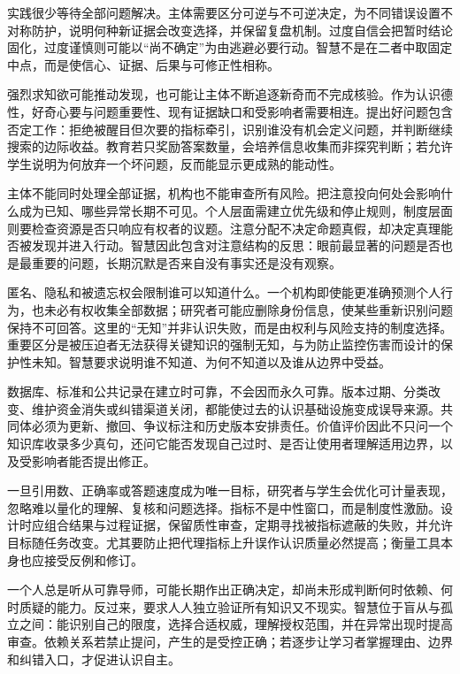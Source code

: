 实践很少等待全部问题解决。主体需要区分可逆与不可逆决定，为不同错误设置不对称防护，说明何种新证据会改变选择，并保留复盘机制。过度自信会把暂时结论固化，过度谨慎则可能以“尚不确定”为由逃避必要行动。智慧不是在二者中取固定中点，而是使信心、证据、后果与可修正性相称。

强烈求知欲可能推动发现，也可能让主体不断追逐新奇而不完成核验。作为认识德性，好奇心要与问题重要性、现有证据缺口和受影响者需要相连。提出好问题包含否定工作：拒绝被醒目但次要的指标牵引，识别谁没有机会定义问题，并判断继续搜索的边际收益。教育若只奖励答案数量，会培养信息收集而非探究判断；若允许学生说明为何放弃一个坏问题，反而能显示更成熟的能动性。

主体不能同时处理全部证据，机构也不能审查所有风险。把注意投向何处会影响什么成为已知、哪些异常长期不可见。个人层面需建立优先级和停止规则，制度层面则要检查资源是否只响应有权者的议题。注意分配不决定命题真假，却决定真理能否被发现并进入行动。智慧因此包含对注意结构的反思：眼前最显著的问题是否也是最重要的问题，长期沉默是否来自没有事实还是没有观察。

匿名、隐私和被遗忘权会限制谁可以知道什么。一个机构即使能更准确预测个人行为，也未必有权收集全部数据；研究者可能应删除身份信息，使某些重新识别问题保持不可回答。这里的“无知”并非认识失败，而是由权利与风险支持的制度选择。重要区分是被压迫者无法获得关键知识的强制无知，与为防止监控伤害而设计的保护性未知。智慧要求说明谁不知道、为何不知道以及谁从边界中受益。

数据库、标准和公共记录在建立时可靠，不会因而永久可靠。版本过期、分类改变、维护资金消失或纠错渠道关闭，都能使过去的认识基础设施变成误导来源。共同体必须为更新、撤回、争议标注和历史版本安排责任。价值评价因此不只问一个知识库收录多少真句，还问它能否发现自己过时、是否让使用者理解适用边界，以及受影响者能否提出修正。

一旦引用数、正确率或答题速度成为唯一目标，研究者与学生会优化可计量表现，忽略难以量化的理解、复核和问题选择。指标不是中性窗口，而是制度性激励。设计时应组合结果与过程证据，保留质性审查，定期寻找被指标遮蔽的失败，并允许目标随任务改变。尤其要防止把代理指标上升误作认识质量必然提高；衡量工具本身也应接受反例和修订。

一个人总是听从可靠导师，可能长期作出正确决定，却尚未形成判断何时依赖、何时质疑的能力。反过来，要求人人独立验证所有知识又不现实。智慧位于盲从与孤立之间：能识别自己的限度，选择合适权威，理解授权范围，并在异常出现时提高审查。依赖关系若禁止提问，产生的是受控正确；若逐步让学习者掌握理由、边界和纠错入口，才促进认识自主。

